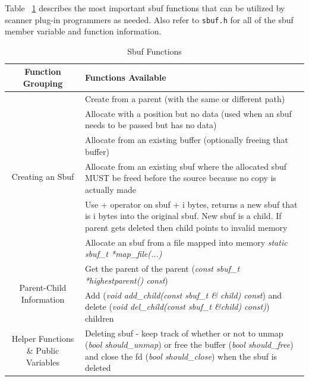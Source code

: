 \documentclass[11pt,fleqn]{article} %
\begin{document}
Table ~\ref{tab:SbufFunctions} describes the most important sbuf functions that can be utilized by scanner plug-in programmers as needed. Also refer to \texttt{sbuf.h} for all of the sbuf member variable and function information.


\begin{table}[!ht]
\centering
\caption{Sbuf Functions}
\label{tab:SbufFunctions}
\begin{tabular}{|c|m{8cm}|}
\hline \hline
\textbf{Function Grouping} & \textbf{Functions Available} \\
\hline
\multirow{6}{4 cm}{\centering \newline \newline \newline \newline \newline \newline Creating an Sbuf} & Create from a parent (with the same or different path) \\\cline{2-2}
 & Allocate with a position but no data (used when an sbuf needs to be passed but has no data)  \\\cline{2-2}
 & Allocate from an existing buffer (optionally freeing that buffer)\\\cline{2-2} 
& Allocate from an existing sbuf where the allocated sbuf MUST be freed before the source because no copy is actually made\\\cline{2-2}
& Use + operator on sbuf + i bytes, returns a new sbuf that is i bytes into the original sbuf. New sbuf is a child. If parent gets deleted then child points to invalid memory \\\cline{2-2}
& Allocate an sbuf from a file mapped into memory \textit{static sbuf\_t *map\_file(...)} \\\cline{2-2}
\hline
\multirow{2}{4 cm}{\centering \newline Parent-Child Information}  & Get the parent of the parent (\textit{const sbuf\_t *highestparent() const}) \\\cline{2-2}
& Add (\textit{void add\_child(const sbuf\_t \& child) const}) and delete (\textit{void del\_child(const sbuf\_t \&child) const)}) children\\\cline{2-2}
\hline
\multirow{3}{4 cm}{\centering Helper Functions \& Public Variables} & Deleting sbuf - keep track of whether or not to unmap (\textit{bool should\_unmap}) or free the buffer (\textit{bool should\_free}) and close the fd (\textit{bool should\_close}) when the sbuf is deleted \\\cline{2-2}

\end{tabular}
\end{table}
\end{document}
